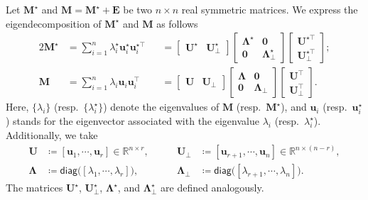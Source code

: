 Let $\bm{M}^{\star}$ and $\bm{M}=\bm{M}^{\star}+\bm{E}$ be two $n\times n$ real symmetric
matrices. We express the eigendecomposition
of $\bm{M}^{\star}$ and $\bm{M}$ as follows
%
\begin{alignat}{2}
\bm{M}^{\star} & =\sum_{i=1}^{n}\lambda_{i}^{\star}\bm{u}_{i}^{\star}\bm{u}_{i}^{\star\top} & & =\left[\begin{array}{cc}
\bm{U}^{\star} & \bm{U}_{\perp}^{\star}\end{array}\right]\left[\begin{array}{cc}
\bm{\Lambda}^{\star} & \bm{0}\\
\bm{0} & \bm{\Lambda}_{\perp}^{\star}
\end{array}\right]\left[\begin{array}{c}
\bm{U}^{\star\top}\\
\bm{U}_{\perp}^{\star\top}
\end{array}\right];  \label{eq:M-e-decompose} \\
\bm{M} & =\sum_{i=1}^{n}\lambda_{i}\bm{u}_{i}\bm{u}_{i}^{\top} & & =\left[\begin{array}{cc}
\bm{U} & \bm{U}_{\perp}\end{array}\right]\left[\begin{array}{cc}
\bm{\Lambda} & \bm{0}\\
\bm{0} & \bm{\Lambda}_{\perp}
\end{array}\right]\left[\begin{array}{c}
\bm{U}^{\top}\\
\bm{U}_{\perp}^{\top}
\end{array}\right]. \label{eq:Mstar-e-decompose}
\end{alignat}
%
Here, $\{\lambda_{i}\}$ (resp.~$\{\lambda_{i}^{\star}\}$)  denote
the eigenvalues of $\bm{M}$ (resp.~$\bm{M}^{\star}$), and $\bm{u}_{i}$ (resp.~$\bm{u}_i^{\star}$)
stands for the eigenvector associated with the eigenvalue $\lambda_{i}$ (resp.~$\lambda_i^{\star}$).
Additionally, we take
%
\begin{align*}
	  \bm{U} &\coloneqq[\bm{u}_{1},\cdots,\bm{u}_{r}]\in\mathbb{R}^{n\times r}, \qquad&\bm{U}_{\perp} &\coloneqq[\bm{u}_{r+1},\cdots,\bm{u}_{n}]\in\mathbb{R}^{n\times (n-r)},\\
	  \bm{\Lambda}&\coloneqq\mathsf{diag}\big([\lambda_{1},\cdots,\lambda_{r}]\big),\qquad &\bm{\Lambda}_{\perp}  &\coloneqq \mathsf{diag}\big([\lambda_{r+1},\cdots,\lambda_{n}]\big).
\end{align*}
%
The matrices $\bm{U}^{\star}$, $\bm{U}_{\perp}^{\star}$, $\bm{\Lambda}^{\star}$, and $\bm{\Lambda}_{\perp}^{\star}$ are defined analogously.



